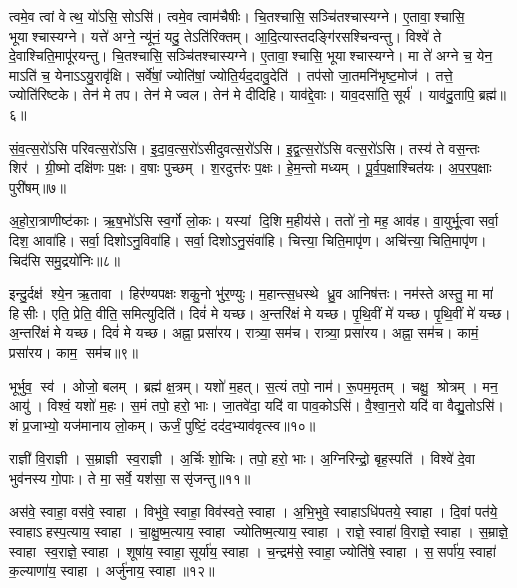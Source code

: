    त्वमे॒व त्वां वेत्थ॒ यो॑ऽसि॒ सोऽसि॑।
   त्वमे॒व त्वाम॑चैषीः।
   चि॒तश्चासि॒ सञ्चि॑तश्चास्यग्ने।
   ए॒तावा॒श्चासि॒ भूयाश्चास्यग्ने।
   यत्ते॑ अग्ने॒ न्यू॑नं॒ यदु॒ तेऽति॑रिक्तम्।
   आ॒दि॒त्यास्तदङ्गि॑रस\-श्चिन्वन्तु।
   विश्वे॑ ते दे॒वाश्चिति॒मापू॑रयन्तु।
   चि॒तश्चासि॒ सञ्चि॑तश्चास्यग्ने।
   ए॒तावा॒श्चासि॒ भूयाश्चास्यग्ने।
   मा ते॑ अग्ने च॒ येन॒ माऽति॑ च॒ येनाऽऽयु॒रावृ॑क्षि।
   सर्वे॑षां॒ ज्योति॑षां॒ ज्योति॒र्यद॒दावु॒देति॑ ।
   तप॑सो जा॒तमनि॑भृष्ट॒मोज॑।
   तत्ते॒ ज्योति॑रिष्टके।
   तेन॑ मे तप।
   तेन॑ मे ज्वल।
   तेन॑ मे दीदिहि।
   याव॑द्दे॒वाः।
   याव॒दसा॑ति॒ सूर्य॑।
   याव॑दु॒तापि॒ ब्रह्म॑॥६॥
\anuvakamend

   सं॒व॒त्स॒रो॑ऽसि परिवत्स॒रो॑ऽसि।
   इ॒दा॒व॒त्स॒रो॑ऽसीदुवत्स॒रो॑ऽसि।
   इ॒द्व॒त्स॒रो॑ऽसि वत्स॒रो॑ऽसि।
   तस्य॑ ते वस॒न्तः शिर॑।
   ग्री॒ष्मो दक्षि॑णः प॒क्षः।
   व॒षाः पुच्छम्।
   श॒रदुत्त॑रः प॒क्षः।
   हे॒म॒न्तो मध्यम्।
   पू॒र्व॒प॒क्षाश्चित॑यः।
   अ॒प॒र॒प॒क्षाः पुरी॑षम्॥७॥

   अ॒हो॒रा॒त्राणीष्ट॑काः।
   ऋ॒ष॒भो॑ऽसि स्व॒र्गो लो॒कः।
   यस्यां दि॒शि म॒हीय॑से।
   ततो॑ नो॒ मह॒ आव॑ह।
   वा॒युर्भू॒त्वा सर्वा॒ दिश॒ आवा॑हि।
   सर्वा॒ दिशोऽनु॒विवा॑हि।
   सर्वा॒ दिशोऽनु॒संवा॑हि।
   चित्त्या॒ चिति॒मापृ॑ण।
   अचि॑त्त्या॒  चिति॒मापृ॑ण।
   चिद॑सि समु॒द्रयो॑निः॥८॥

   इन्दु॒र्दक्ष॑ श्ये॒न ऋ॒तावा।
   हिर॑ण्यपक्षः शकु॒नो भु॑र॒ण्युः।
   म॒हान्त्स॒धस्थे ध्रु॒व आनिष॑त्तः।
   नम॑स्ते अस्तु॒ मा मा॑ हिसीः।
   एति॒ प्रेति॒ वीति॒ समित्युदिति॑।
   दिवं॑ मे यच्छ।
   अ॒न्तरि॑क्षं मे यच्छ।
   पृ॒थि॒वीं मे॑ यच्छ।
   पृ॒थि॒वीं मे॑ यच्छ।
   अ॒न्तरि॑क्षं मे यच्छ।
   दिवं॑ मे यच्छ।
   अह्ना॒ प्रसा॑रय।
   रात्र्या॒ सम॑च।
   रात्र्या॒ प्रसा॑रय।
   अह्ना॒ सम॑च।
   कामं॒ प्रसा॑रय।
   काम॒ सम॑च॥९॥
   \anuvakamend

   भूर्भुव॒ स्व॑।
   ओजो॒ बलम्।
   ब्रह्म॑ क्ष॒त्रम्।
   यशो॑ म॒हत्।
   स॒त्यं तपो॒ नाम॑।
   रू॒पम॒मृतम्।
   चक्षु॒ श्रोत्रम्।
   मन॒ आयु॑।
   विश्वं॒ यशो॑ म॒हः।
   स॒मं तपो॒ हरो॒ भाः।
   जा॒तवे॑दा॒ यदि॑ वा पाव॒कोऽसि॑।
   वै॒श्वा॒न॒रो यदि॑ वा वैद्यु॒तोऽसि॑।
   शं प्र॒जाभ्यो॒ यज॑मानाय लो॒कम्।
   ऊर्जं॒ पुष्टिं॒ दद॑द॒भ्याव॑वृत्स्व॥१०॥
   \anuvakamend

   राज्ञी॑ वि॒राज्ञी।
   स॒म्राज्ञी स्व॒राज्ञी।
   अ॒र्चिः शो॒चिः।
   तपो॒ हरो॒ भाः।
   अ॒ग्निरिन्द्रो॒ बृह॒स्पति॑।
   विश्वे॑ दे॒वा भुव॑नस्य गो॒पाः।
   ते मा॒ सर्वे॒ यश॑सा॒ ससृ॑जन्तु॥११॥
\anuvakamend

   अस॑वे॒ स्वाहा॒ वस॑वे॒ स्वाहा।
   विभु॑वे॒ स्वाहा॒ विव॑स्वते॒ स्वाहा।
   अ॒भि॒भुवे॒ स्वाहाऽधि॑पतये॒ स्वाहा।
   दि॒वां पत॑ये॒ स्वाहाऽहस्प॒त्याय॒ स्वाहा।
   चा॒क्षु॒ष्म॒त्याय॒ स्वाहा ज्योतिष्म॒त्याय॒ स्वाहा।
   राज्ञे॒ स्वाहा॑ वि॒राज्ञे॒ स्वाहा।
   स॒म्राज्ञे॒ स्वाहा स्व॒राज्ञे॒ स्वाहा।
   शूषा॑य॒ स्वाहा॒ सूर्या॑य॒ स्वाहा।
   च॒न्द्रम॑से॒ स्वाहा॒ ज्योति॑षे॒ स्वाहा।
   स॒सर्पा॑य॒ स्वाहा॑ क॒ल्याणा॑य॒ स्वाहा।
   अर्जु॑नाय॒ स्वाहा॥१२॥
\anuvakamend

